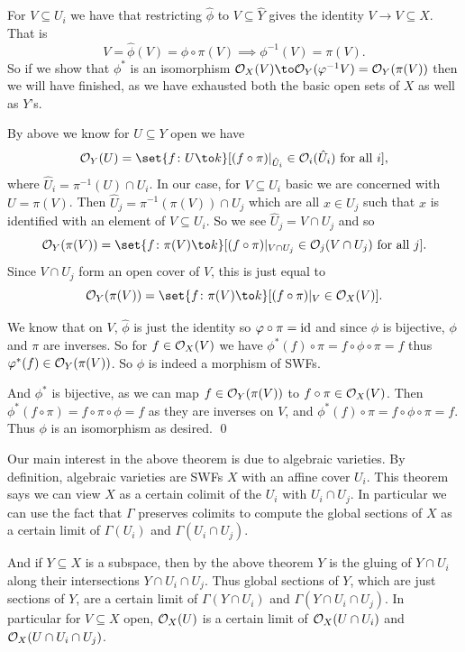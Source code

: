     For $V\subseteq U_i$ we have that restricting $\hat\phi$ to $V\subseteq\hat Y$ gives the identity $V\to V\subseteq X$.
    That is
    $$ V = \hat\phi(V) = \phi\circ\pi(V) \implies \phi^{-1}(V) = \pi(V) . $$
    So if we show that $\phi^*$ is an isomorphism $\O_X(V)\to\O_Y(\phi^{-1}V)=\O_Y(\pi(V))$ then we will have finished, as we have exhausted both the basic open sets of $X$ as well as $Y$'s.

    By above we know for $U\subseteq Y$ open we have
    $$ \O_Y(U) = \set{f\colon U\to k}[(f\circ\pi)|_{\hat U_i}\in\O_i(\hat U_i)\hbox{ for all $i$}] , $$
    where $\hat U_i=\pi^{-1}(U)\cap U_i$.
    In our case, for $V\subseteq U_i$ basic we are concerned with $U=\pi(V)$.
    Then $\hat U_j=\pi^{-1}(\pi(V))\cap U_j$ which are all $x\in U_j$ such that $x$ is identified with an element of $V\subseteq U_i$.
    So we see $\hat U_j=V\cap U_j$ and so
    $$ \O_Y(\pi(V)) = \set{f\colon\pi(V)\to k}[(f\circ\pi)|_{V\cap U_j}\in\O_j(V\cap U_j)\hbox{ for all $j$}] . $$
    Since $V\cap U_j$ form an open cover of $V$, this is just equal to
    $$ \O_Y(\pi(V)) = \set{f\colon\pi(V)\to k}[(f\circ\pi)|_V\in\O_X(V)] . $$

    We know that on $V$, $\hat\phi$ is just the identity so $\varphi\circ\pi={\rm id}$ and since $\phi$ is bijective, $\phi$ and $\pi$ are inverses.
    So for $f\in{{\cal O}}_X(V)$ we have $\phi^*(f)\circ\pi=f\circ\phi\circ\pi=f$ thus $\varphi^*(f)\in{{\cal O}}_Y(\pi(V))$.
    So $\phi$ is indeed a morphism of SWFs.

    And $\phi^*$ is bijective, as we can map $f\in{{\cal O}}_Y(\pi(V))$ to $f\circ\pi\in{{\cal O}}_X(V)$.
    Then $\phi^*(f\circ\pi)=f\circ\pi\circ\phi=f$ as they are inverses on $V$, and $\phi^*(f)\circ\pi=f\circ\phi\circ\pi=f$.
    Thus $\phi$ is an isomorphism as desired.
    \qed

\eproof

Our main interest in the above theorem is due to algebraic varieties.
By definition, algebraic varieties are SWFs $X$ with an affine cover $U_i$.
This theorem says we can view $X$ as a certain colimit of the $U_i$ with $U_i\cap U_j$.
In particular we can use the fact that $\Gamma$ preserves colimits to compute the global sections of $X$ as a certain limit of $\Gamma(U_i)$ and $\Gamma(U_i\cap U_j)$.

And if $Y\subseteq X$ is a subspace, then by the above theorem $Y$ is the gluing of $Y\cap U_i$ along their intersections $Y\cap U_i\cap U_j$.
Thus global sections of $Y$, which are just sections of $Y$, are a certain limit of $\Gamma(Y\cap U_i)$ and $\Gamma(Y\cap U_i\cap U_j)$.
In particular for $V\subseteq X$ open, ${{\cal O}}_X(U)$ is a certain limit of ${{\cal O}}_X(U\cap U_i)$ and ${{\cal O}}_X(U\cap U_i\cap U_j)$.

